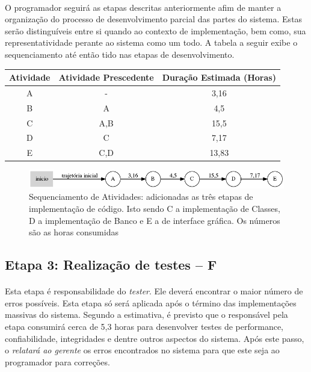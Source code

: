 \documentclass[12pt,a4paper]{article}
\begin{document}
		\paragraph{}O programador seguirá as etapas descritas anteriormente afim de manter a organização do processo de desenvolvimento parcial das partes do sistema. Estas serão distinguíveis entre si quando ao contexto de implementação, bem como, sua representatividade perante ao sistema como um todo. A tabela a seguir exibe o sequenciamento até então tido nas etapas de desenvolvimento.
        \begin{table}[!ht]
        \centering
        \begin{tabular}{|c|c|c|}
        \hline 
        Atividade & Atividade Prescedente & Duração Estimada (Horas) \\ 
        \hline 
		A & - & 3,16 \\ 
		\hline 
		B & A & 4,5 \\  
        \hline 
        C & A,B & 15,5 \\ 
        \hline 
        D & C & 7,17 \\ 
        \hline 
        E & C,D & 13,83 \\ 
        \hline 
        \end{tabular} 
        \end{table} 
        \begin{figure}[!ht]       		
			\includegraphics[scale=0.5]{002.png}
			\caption{Sequenciamento de Atividades: adicionadas as três etapas de implementação de código. Isto sendo C a implementação de Classes, D a implementação de Banco e E a de interface gráfica. Os números são as horas consumidas}
			\end{figure}
		\subsection{Etapa 3: Realização de testes -- F}
		
		
		\paragraph{} Esta etapa é responsabilidade do \textit{tester}. Ele deverá encontrar o maior número de erros possíveis. Esta etapa só será aplicada após o término das implementações massivas do sistema. Segundo a estimativa, é previsto que o responsável pela etapa consumirá cerca de 5,3 horas para desenvolver testes de performance, confiabilidade, integridades e dentre outros aspectos do sistema. Após este passo, o \textit{relatará ao gerente} os erros encontrados no sistema para que este seja ao programador para correções.
\end{document}
